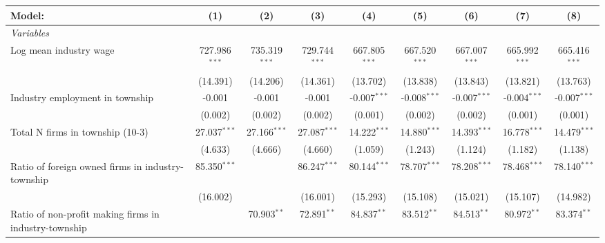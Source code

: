 \begingroup
\centering
\begin{tabular}{lcccccccc}
   \tabularnewline \midrule \midrule
   Model:                                                & (1)             & (2)             & (3)             & (4)              & (5)              & (6)              & (7)              & (8)\\  
   \midrule
   \emph{Variables}\\
   Log mean industry wage                                & 727.986$^{***}$ & 735.319$^{***}$ & 729.744$^{***}$ & 667.805$^{***}$  & 667.520$^{***}$  & 667.007$^{***}$  & 665.992$^{***}$  & 665.416$^{***}$\\   
                                                         & (14.391)        & (14.206)        & (14.361)        & (13.702)         & (13.838)         & (13.843)         & (13.821)         & (13.763)\\   
   Industry employment in township                       & -0.001          & -0.001          & -0.001          & -0.007$^{***}$   & -0.008$^{***}$   & -0.007$^{***}$   & -0.004$^{***}$   & -0.007$^{***}$\\   
                                                         & (0.002)         & (0.002)         & (0.002)         & (0.001)          & (0.002)          & (0.002)          & (0.001)          & (0.001)\\   
   Total N firms in township (10-3)                      & 27.037$^{***}$  & 27.166$^{***}$  & 27.087$^{***}$  & 14.222$^{***}$   & 14.880$^{***}$   & 14.393$^{***}$   & 16.778$^{***}$   & 14.479$^{***}$\\   
                                                         & (4.633)         & (4.666)         & (4.660)         & (1.059)          & (1.243)          & (1.124)          & (1.182)          & (1.138)\\   
   Ratio of foreign owned firms in industry-township     & 85.350$^{***}$  &                 & 86.247$^{***}$  & 80.144$^{***}$   & 78.707$^{***}$   & 78.208$^{***}$   & 78.468$^{***}$   & 78.140$^{***}$\\   
                                                         & (16.002)        &                 & (16.001)        & (15.293)         & (15.108)         & (15.021)         & (15.107)         & (14.982)\\   
   Ratio of non-profit making firms in industry-township &                 & 70.903$^{**}$   & 72.891$^{**}$   & 84.837$^{**}$    & 83.512$^{**}$    & 84.513$^{**}$    & 80.972$^{**}$    & 83.374$^{**}$\\   

\end{tabular}
